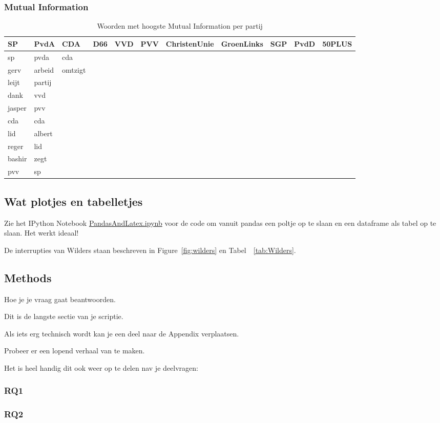 \subsubsection{Mutual Information}
\begin{table}[H]
    \centering
    \caption{Woorden met hoogste Mutual Information per partij}
    \begin{tabular}{|l|l|l|l|l|l|l|l|l|l|l|}
    \hline
    SP & PvdA & CDA & D66 & VVD & PVV & ChristenUnie & GroenLinks & SGP & PvdD & 50PLUS \\ \hline
    sp & pvda & cda & ~ & ~ & ~ & ~ & ~ & ~ & ~ & ~ \\ 
    gerv & arbeid & omtzigt & ~ & ~ & ~ & ~ & ~ & ~ & ~ & ~ \\ 
    leijt & partij & ~ & ~ & ~ & ~ & ~ & ~ & ~ & ~ & ~ \\
    dank & vvd & ~ & ~ & ~ & ~ & ~ & ~ & ~ & ~ & ~ \\
    jasper & pvv & ~ & ~ & ~ & ~ & ~ & ~ & ~ & ~ & ~ \\
    cda & cda & ~ & ~ & ~ & ~ & ~ & ~ & ~ & ~ & ~ \\
    lid & albert & ~ & ~ & ~ & ~ & ~ & ~ & ~ & ~ & ~ \\
    reger & lid & ~ & ~ & ~ & ~ & ~ & ~ & ~ & ~ & ~ \\
    bashir & zegt & ~ & ~ & ~ & ~ & ~ & ~ & ~ & ~ & ~ \\
    pvv & sp & ~ & ~ & ~ & ~ & ~ & ~ & ~ & ~ & ~ \\
    \end{tabular}
\end{table}
\pagebreak
\subsection{Wat plotjes en tabelletjes}

Zie het IPython Notebook \url{PandasAndLatex.ipynb} voor de code om vanuit pandas een poltje op te slaan en een dataframe als tabel op te slaan. Het werkt ideaal! 

De interrupties van Wilders staan beschreven in Figure~\ref{fig:wilders} en Tabel~~\ref{tab:Wilders}.




\pagebreak



\pagebreak
\subsection{Methods}
Hoe je je vraag gaat beantwoorden.


Dit is de langste sectie van je scriptie. 

Als iets erg technisch wordt kan je een deel naar de Appendix verplaatsen. 

Probeer er een lopend verhaal van te maken.

Het is heel handig dit ook weer op te delen nav je deelvragen:

\subsubsection{RQ1}

\subsubsection{RQ2}
